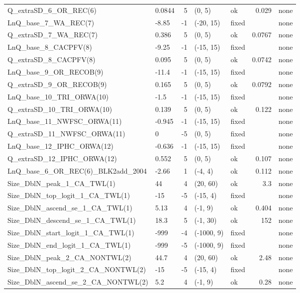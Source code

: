\documentclass[
]{scrartcl}
\begin{document}
\begin{landscape}
\begin{longtable}{llrllrl}
Q\_extraSD\_6\_OR\_REC(6) & 0.0844 & 5 & (0, 5) & ok & 0.029 & none \\ 
LnQ\_base\_7\_WA\_REC(7) & -8.85 & -1 & (-20, 15) & fixed &  & none \\ 
Q\_extraSD\_7\_WA\_REC(7) & 0.386 & 5 & (0, 5) & ok & 0.0767 & none \\ 
LnQ\_base\_8\_CACPFV(8) & -9.25 & -1 & (-15, 15) & fixed &  & none \\ 
Q\_extraSD\_8\_CACPFV(8) & 0.095 & 5 & (0, 5) & ok & 0.0742 & none \\ 
LnQ\_base\_9\_OR\_RECOB(9) & -11.4 & -1 & (-15, 15) & fixed &  & none \\ 
Q\_extraSD\_9\_OR\_RECOB(9) & 0.165 & 5 & (0, 5) & ok & 0.0792 & none \\ 
LnQ\_base\_10\_TRI\_ORWA(10) & -1.5 & -1 & (-15, 15) & fixed &  & none \\ 
Q\_extraSD\_10\_TRI\_ORWA(10) & 0.139 & 5 & (0, 5) & ok & 0.122 & none \\ 
LnQ\_base\_11\_NWFSC\_ORWA(11) & -0.945 & -1 & (-15, 15) & fixed &  & none \\ 
Q\_extraSD\_11\_NWFSC\_ORWA(11) & 0 & -5 & (0, 5) & fixed &  & none \\ 
LnQ\_base\_12\_IPHC\_ORWA(12) & -0.636 & -1 & (-15, 15) & fixed &  & none \\ 
Q\_extraSD\_12\_IPHC\_ORWA(12) & 0.552 & 5 & (0, 5) & ok & 0.107 & none \\ 
LnQ\_base\_6\_OR\_REC(6)\_BLK2add\_2004 & -2.66 & 1 & (-4, 4) & ok & 0.112 & none \\ 
Size\_DblN\_peak\_1\_CA\_TWL(1) & 44 & 4 & (20, 60) & ok & 3.3 & none \\ 
Size\_DblN\_top\_logit\_1\_CA\_TWL(1) & -15 & -5 & (-15, 4) & fixed &  & none \\ 
Size\_DblN\_ascend\_se\_1\_CA\_TWL(1) & 5.13 & 4 & (-1, 9) & ok & 0.404 & none \\ 
Size\_DblN\_descend\_se\_1\_CA\_TWL(1) & 18.3 & 5 & (-1, 30) & ok & 152 & none \\ 
Size\_DblN\_start\_logit\_1\_CA\_TWL(1) & -999 & -4 & (-1000, 9) & fixed &  & none \\ 
Size\_DblN\_end\_logit\_1\_CA\_TWL(1) & -999 & -5 & (-1000, 9) & fixed &  & none \\ 
Size\_DblN\_peak\_2\_CA\_NONTWL(2) & 44.7 & 4 & (20, 60) & ok & 2.48 & none \\ 
Size\_DblN\_top\_logit\_2\_CA\_NONTWL(2) & -15 & -5 & (-15, 4) & fixed &  & none \\ 
Size\_DblN\_ascend\_se\_2\_CA\_NONTWL(2) & 5.2 & 4 & (-1, 9) & ok & 0.28 & none \\ 

\end{longtable}
\end{landscape}
\end{document}
